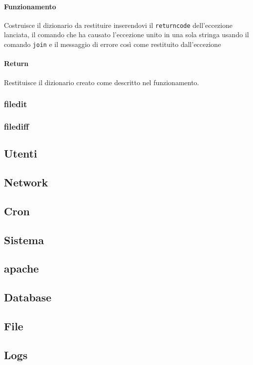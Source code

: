 \documentclass[11pt]{article}
\begin{document}
\paragraph{Funzionamento}
Costruisce il dizionario da restituire inserendovi il \texttt{returncode} dell'eccezione lanciata, il comando che ha causato l'eccezione
unito in una sola stringa usando il comando \texttt{join} e il messaggio di errore così come restituito dall'eccezione
\paragraph{Return}
Restituisce il dizionario creato come descritto nel funzionamento.

\subsubsection{filedit}\label{filedit}
\subsubsection{filediff}\label{filediff}

\subsection{Utenti}
\subsection{Network}
\subsection{Cron}
\subsection{Sistema}
\subsection{apache}
\subsection{Database}
\subsection{File}
\subsection{Logs}
\end{document}
